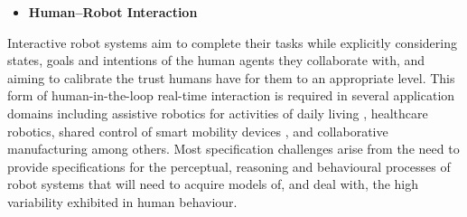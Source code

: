 \documentclass[sigconf,nonacm]{acmart}%
\begin{document}
%
\begin{itemize}[leftmargin=0.5cm]
	\item \textbf{Human–Robot Interaction}%
\end{itemize}
Interactive robot systems aim to complete their tasks while explicitly considering states, goals and intentions of the human agents they collaborate with, and aiming to calibrate the trust humans have for them to an appropriate level. This form of human-in-the-loop real-time interaction is required in several application domains including assistive robotics for activities of daily living \cite{GaoEtAl2020}, healthcare robotics, shared control of smart mobility devices \cite{SohDemiris2015}, and collaborative manufacturing among others. Most specification challenges arise from the need to provide specifications for the perceptual, reasoning and behavioural processes of robot systems that will need to acquire models of, and deal with, the high variability exhibited in human behaviour. 
\end{document}
